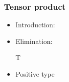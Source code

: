 \documentclass{beamer}
\begin{document}
  \begin{frame}
    \frametitle{Tensor product}
    \begin{itemize}
    \item Introduction:

                {\ctx{\Gamma}{\Delta} \vdash {} \ni {}}
    \item Elimination:

                {\ctx{\Gamma}{\Delta} \vdash {} \in T}
    \item Positive type
    \end{itemize}
  \end{frame}
\end{document}
